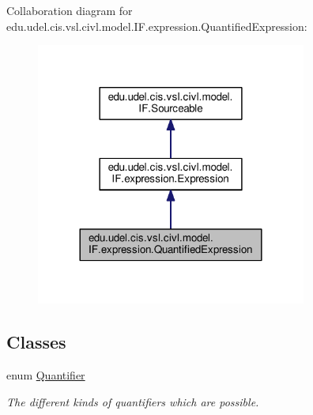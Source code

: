 Collaboration diagram for edu.\+udel.\+cis.\+vsl.\+civl.\+model.\+I\+F.\+expression.\+Quantified\+Expression\+:
\nopagebreak
\begin{figure}[H]
\begin{center}
\leavevmode
\includegraphics[width=252pt]{interfaceedu_1_1udel_1_1cis_1_1vsl_1_1civl_1_1model_1_1IF_1_1expression_1_1QuantifiedExpression__coll__graph}
\end{center}
\end{figure}
\subsection*{Classes}
\begin{DoxyCompactItemize}
\item 
enum \hyperlink{enumedu_1_1udel_1_1cis_1_1vsl_1_1civl_1_1model_1_1IF_1_1expression_1_1QuantifiedExpression_1_1Quantifier}{Quantifier}
\begin{DoxyCompactList}\small\item\em The different kinds of quantifiers which are possible. \end{DoxyCompactList}\end{DoxyCompactItemize}
